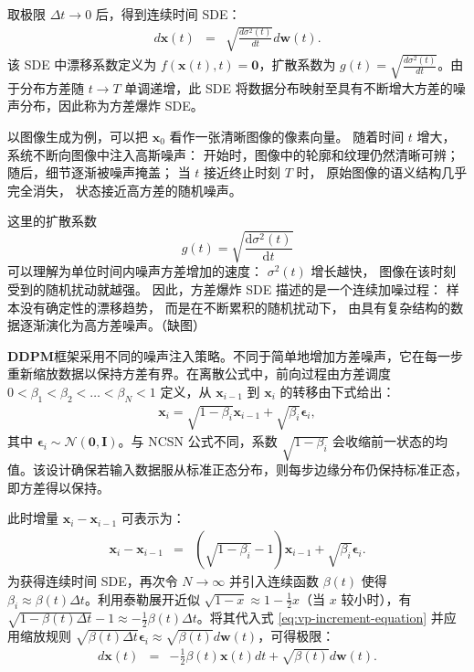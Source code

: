取极限 $\Delta t \to 0$ 后，得到连续时间 SDE：
\begin{eqnarray}
d\mathbf{x}(t) & = & \sqrt{\frac{d\sigma^2(t)}{dt}} d\mathbf{w}(t).
\label{eq:ve-sde}
\end{eqnarray}
该 SDE 中漂移系数定义为 $f(\mathbf{x}(t), t) = \mathbf{0}$，扩散系数为 $g(t) = \sqrt{\frac{d\sigma^2(t)}{dt}}$。由于分布方差随 $t \to T$ 单调递增，此 SDE 将数据分布映射至具有不断增大方差的噪声分布，因此称为方差爆炸 SDE。

以图像生成为例，可以把
\(\mathbf{x}_0\)
看作一张清晰图像的像素向量。
随着时间 \(t\) 增大，系统不断向图像中注入高斯噪声：
开始时，图像中的轮廓和纹理仍然清晰可辨；
随后，细节逐渐被噪声掩盖；
当 \(t\) 接近终止时刻 \(T\) 时，
原始图像的语义结构几乎完全消失，
状态接近高方差的随机噪声。

这里的扩散系数
\[
    g(t)
    =
    \sqrt{
        \frac{\mathrm{d}\sigma^2(t)}
        {\mathrm{d}t}
    }
\]
可以理解为单位时间内噪声方差增加的速度：
\(\sigma^2(t)\) 增长越快，
图像在该时刻受到的随机扰动就越强。
因此，方差爆炸 SDE 描述的是一个连续加噪过程：
样本没有确定性的漂移趋势，
而是在不断累积的随机扰动下，
由具有复杂结构的数据逐渐演化为高方差噪声。（缺图）

\textbf{DDPM}框架采用不同的噪声注入策略。不同于简单地增加方差噪声，它在每一步重新缩放数据以保持方差有界。在离散公式中，前向过程由方差调度 $0 < \beta_1 < \beta_2 < \dots < \beta_N < 1$ 定义，从 $\mathbf{x}_{i-1}$ 到 $\mathbf{x}_i$ 的转移由下式给出：
\begin{eqnarray}
\mathbf{x}_i = \sqrt{1 - \beta_i} \mathbf{x}_{i-1} + \sqrt{\beta_i} \boldsymbol{\epsilon}_i,
\end{eqnarray}
其中 $\boldsymbol{\epsilon}_i \sim \mathcal{N}(\mathbf{0}, \mathbf{I})$。与 NCSN 公式不同，系数 $\sqrt{1 - \beta_i}$ 会收缩前一状态的均值。该设计确保若输入数据服从标准正态分布，则每步边缘分布仍保持标准正态，即方差得以保持。

此时增量 $\mathbf{x}_i - \mathbf{x}_{i-1}$ 可表示为：
\begin{eqnarray}
\mathbf{x}_i - \mathbf{x}_{i-1} & = & (\sqrt{1 - \beta_i} - 1) \mathbf{x}_{i-1} + \sqrt{\beta_i} \boldsymbol{\epsilon}_i.
\label{eq:vp-increment-equation}
\end{eqnarray}
为获得连续时间 SDE，再次令 $N \to \infty$ 并引入连续函数 $\beta(t)$ 使得 $\beta_i \approx \beta(t) \Delta t$。利用泰勒展开近似 $\sqrt{1 - x} \approx 1 - \frac{1}{2}x$（当 $x$ 较小时），有 $\sqrt{1 - \beta(t) \Delta t} - 1 \approx -\frac{1}{2}\beta(t) \Delta t$。将其代入式 \eqref{eq:vp-increment-equation} 并应用缩放规则 $\sqrt{\beta(t) \Delta t} \boldsymbol{\epsilon}_i \approx \sqrt{\beta(t)} d\mathbf{w}(t)$，可得极限：
\begin{eqnarray}
d\mathbf{x}(t) & = & -\frac{1}{2} \beta(t) \mathbf{x}(t) d t + \sqrt{\beta(t)} d\mathbf{w}(t).
\label{eq:vp-sde}
\end{eqnarray}

